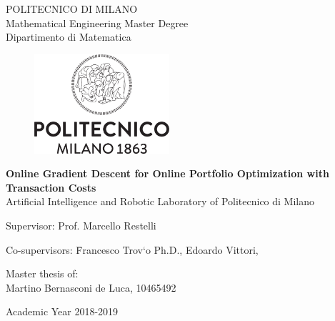 \thispagestyle{empty}
\vspace*{-1.5cm}
 \bfseries{
\begin{center}
  \large
  POLITECNICO DI MILANO\\
  \normalsize
  Mathematical Engineering Master Degree\\
  Dipartimento di Matematica\\
  \begin{figure}[htbp]
    \begin{center}
      \includegraphics[width=5cm]{./img/logo/Logo_Politecnico_Milano.png}
    \end{center}
  \end{figure}
  \vspace*{0.1cm} \LARGE


    \textbf{Online Gradient Descent for Online Portfolio Optimization with Transaction Costs}\\


  \vspace*{.75truecm} \large
  Artificial Intelligence and Robotic Laboratory \newline of Politecnico di Milano
\end{center}
\vspace*{2.0cm} \large
\begin{flushleft}


  Supervisor: Prof. Marcello Restelli \\

  \begin{tabbing}  
      Co-supervisors: \=  Francesco Trov\a`{o} Ph.D.,
      Edoardo Vittori,
  \end{tabbing}
\end{flushleft}
\vspace*{1.0cm}
\begin{flushright}


  Master thesis of:\\ Martino Bernasconi de Luca, 10465492\\


\end{flushright}
\vspace*{0.8cm}
\begin{center}

  Academic Year 2018-2019 %
\end{center} \clearpage
}
